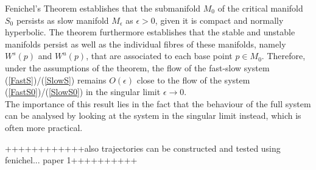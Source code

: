 Fenichel's Theorem establishes that the submanifold $M_0$ of the critical manifold $S_0$ persists as slow manifold $M_\epsilon$ as $\epsilon >0$, given it is compact and normally hyperbolic. The theorem furthermore establishes that the stable and unstable manifolds persist as well as the individual fibres of these manifolds, namely $W^s(p)$ and $W^u(p)$, that are associated to each base point $p \in M_0$.
Therefore, under the assumptions of the theorem, the flow of the fast-slow system (\ref{FastS})/(\ref{SlowS}) remains $O(\epsilon)$ close to the flow of the system (\ref{FastS0})/(\ref{SlowS0}) in the singular limit $\epsilon \to 0$.
\\
The importance of this result lies in the fact that the behaviour of the full system can be analysed by looking at the system in the singular limit instead, which is often more practical.


++++++++++++also trajectories can be constructed and tested using fenichel... paper 1++++++++++
